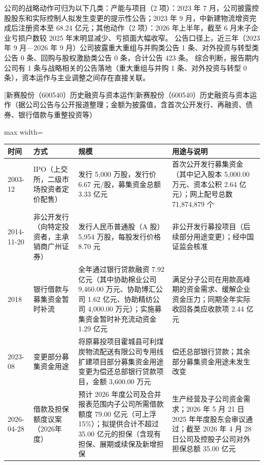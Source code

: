  公司的战略动作可归为以下几类：产能与项目（2 项）：2023 年 7 月，公司披露控股股东和实际控制人拟发生变更的提示性公告；2023 年 9 月，中新建物流增资完成后注册资本至 68.24 亿元；其他动作（2 项）：2026 年上半年，截至 6 月末子企业亏损户数较 2025 年末明显减少、亏损面大幅收窄。 公告口径上，近三年（2023 年 9 月---2026 年 9 月）公司披露重大重组与并购类公告 1 条、对外投资与转型类公告 0 条、回购与股权激励类公告 0 条，合计公告 423 条。 综合判断，报告期内公司有 1 条与战略相关的公告落地（重大重组与并购 1 条、对外投资与转型 0 条），资本运作与主业调整之间存在直接关联。

\begin{center}\small\setlength{\tabcolsep}{4pt}
[新赛股份（600540）历史融资与资本运作]{新赛股份（600540）历史融资与资本运作（据公司公告与公开报道整理；金额为披露值，含首次公开发行、再融资、债券、银行借款与重整投资等）}
\begin{adjustbox}{max width=\textwidth}
\begin{tabular}{@{}p{1.45cm}p{2.55cm}p{4.05cm}p{4.95cm}@{}}
\toprule
时间 & 方式 & 规模 & 用途与说明 \\
\midrule
2003-12 & IPO（上交所，二级市场投资者定价配售） & 发行 5,\allowbreak{}000 万股，\allowbreak{}发行价 6.67 元/\allowbreak{}股，\allowbreak{}募集资金总额 3.33 亿元 & 首次公开发行募集资金（其中记入股本 5,\allowbreak{}000.00 万元、\allowbreak{}资本公积 2.64 亿元）；网上配号总数 71,\allowbreak{}874,\allowbreak{}879 个 \\
2014-11-20 & 非公开发行（向特定投资者，主承销商广州证券） & 发行人民币普通股（A 股）5,\allowbreak{}954 万股，\allowbreak{}每股发行价格 8.70 元 & 非公开发行募投项目（后续部分用途变更）；经中国证监会核准 \\
2018 & 银行借款与募集资金暂时补流 & 全年通过银行贷款融资 7.92 亿元（其中协助棉业公司 9,\allowbreak{}460.00 万元、\allowbreak{}协助博汇公司 1.62 亿元、\allowbreak{}协助精纺公司 4,\allowbreak{}000.00 万元）；实施募集资金暂时补充流动资金 1.29 亿元 & 满足分子公司在用款高峰期的资金需求、\allowbreak{}缓解企业资金压力；同期全年实际收回各类应收款项 2.44 亿元 \\
2023-08 & 变更部分募集资金用途 & 将原募投项目霍城县可利煤炭物流配送有限公司专用线扩建项目部分募集资金用途变更为偿还总部银行贷款项目，\allowbreak{}金额 3,\allowbreak{}600.00 万元 & 偿还总部银行贷款；其余部分募集资金用途未发生改变 \\
2026-04-28 & 借款及担保额度议案（2026年度） & 预计 2026 年度公司及合并报表范围内子公司所需借款额度 79.00 亿元（可上浮 15\%）；拟提供合计不超过 35.00 亿元的担保（含现有担保、\allowbreak{}展期或续保及新增担保 & 生产经营及子公司资金需求；2026 年 5 月 21 日 2025 年年度股东会审议通过；截至 2026 年 4 月 28 日公司及控股子公司对外担保总额 35.00 亿元 \\
\bottomrule
\end{tabular}
\end{adjustbox}
\end{center}

